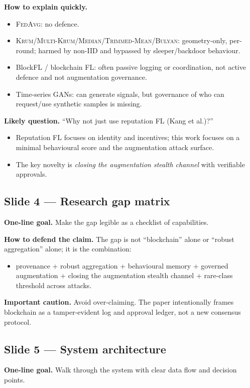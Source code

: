 \documentclass[11pt,a4paper]{article}
\newcommand{\fedavg}{\textsc{FedAvg}\xspace}
\newcommand{\krum}{\textsc{Krum}\xspace}
\newcommand{\mkrum}{\textsc{Multi-Krum}\xspace}
\newcommand{\median}{\textsc{Median}\xspace}
\newcommand{\tmean}{\textsc{Trimmed-Mean}\xspace}
\newcommand{\bulyan}{\textsc{Bulyan}\xspace}
\begin{document}
\textbf{How to explain quickly.}
\begin{itemize}
\item \fedavg: no defence.
\item \krum/\mkrum/\median/\tmean/\bulyan: geometry-only, per-round; harmed by non-IID and bypassed by sleeper/backdoor behaviour.
\item BlockFL / blockchain FL: often passive logging or coordination, not active defence and not augmentation governance.
\item Time-series GANs: can generate signals, but governance of who can request/use synthetic samples is missing.
\end{itemize}

\textbf{Likely question.} ``Why not just use reputation FL (Kang et al.)?''
\begin{itemize}
\item Reputation FL focuses on identity and incentives; this work focuses on a minimal behavioural score and the augmentation attack surface.
\item The key novelty is \emph{closing the augmentation stealth channel} with verifiable approvals.
\end{itemize}

\subsection{Slide 4 --- Research gap matrix}
\textbf{One-line goal.} Make the gap legible as a checklist of capabilities.

\textbf{How to defend the claim.}
The gap is not ``blockchain'' alone or ``robust aggregation'' alone; it is the combination:
\begin{itemize}
\item provenance + robust aggregation + behavioural memory + governed augmentation + closing the augmentation stealth channel + rare-class threshold across attacks.
\end{itemize}

\textbf{Important caution.}
Avoid over-claiming. The paper intentionally frames blockchain as a tamper-evident log and approval ledger, not a new consensus protocol.

\subsection{Slide 5 --- System architecture}
\textbf{One-line goal.} Walk through the system with clear data flow and decision points.
\end{document}
